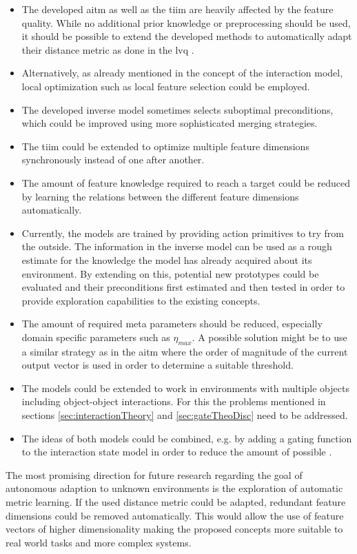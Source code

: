 \begin{itemize}
\item The developed \gls{aitm} as well as the \gls{tiim} are heavily affected by the feature quality. While no additional prior knowledge or preprocessing should be used, it should be possible to extend the developed methods to automatically adapt their distance metric as done in the \gls{lvq} \cite{lvq}.
\item Alternatively, as already mentioned in the concept of the interaction model, local optimization such as local feature selection could be employed.
\item The developed inverse model sometimes selects suboptimal preconditions, which could be improved using more sophisticated merging strategies.
\item The \gls{tiim} could be extended to optimize multiple feature dimensions synchronously instead of one after another.
\item The amount of feature knowledge required to reach a target could be reduced by learning the relations between the different feature dimensions automatically.
\item Currently, the models are trained by providing action primitives to try from the outside. The information in the inverse model can be used as a rough estimate for the knowledge the model has already acquired about its environment. By extending on this, potential new prototypes could be evaluated and their preconditions first estimated and then tested in order to provide exploration capabilities to the existing concepts.
\item The amount of required meta parameters should be reduced, especially domain specific parameters such as $\eta_{max}$. A possible solution might be to use a similar strategy as in the \gls{aitm} where the order of magnitude of the current output vector is used in order to determine a suitable threshold.
\item The models could be extended to work in environments with multiple objects including object-object interactions. For this the problems mentioned in sections \ref{sec:interactionTheory} and \ref{sec:gateTheoDisc} need to be addressed.
\item The ideas of both models could be combined, e.g. by adding a gating function to the interaction state model in order to reduce the amount of possible .
\end{itemize}

The most promising direction for future research regarding the goal of autonomous adaption to unknown environments is the exploration of automatic metric learning. If the used distance metric could be adapted, redundant feature dimensions could be removed automatically. This would allow the use of feature vectors of higher dimensionality making the proposed concepts more suitable to real world tasks and more complex systems. 

